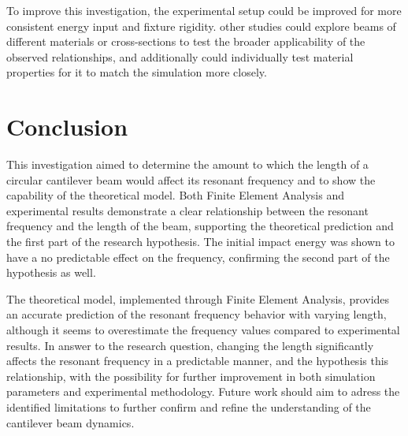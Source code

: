 \documentclass[a4paper,12pt]{article}
\begin{document}
To improve this investigation, the experimental setup could be improved for more consistent energy input and fixture rigidity. other studies could explore beams of different materials or cross-sections to test the broader applicability of the observed relationships, and additionally could individually test material properties for it to match the simulation more closely.


\section{Conclusion}%

This investigation aimed to determine the amount to which the length of a circular cantilever beam would affect its resonant frequency and to show the capability of the theoretical model. Both Finite Element Analysis and experimental results demonstrate a clear relationship between the resonant frequency and the length of the beam, supporting the theoretical prediction and the first part of the research hypothesis.  The initial impact energy was shown to have a no predictable effect on the frequency, confirming the second part of the hypothesis as well.

The theoretical model, implemented through Finite Element Analysis, provides an accurate prediction of the resonant frequency behavior with varying length, although it seems to overestimate the frequency values compared to experimental results. In answer to the research question, changing the length significantly affects the resonant frequency in a predictable manner, and the hypothesis this relationship, with the possibility for further improvement in both simulation parameters and experimental methodology. Future work should aim to adress the identified limitations to further confirm and refine the understanding of the cantilever beam dynamics.

\pagebreak
{}
\printbibliography
\end{document}
